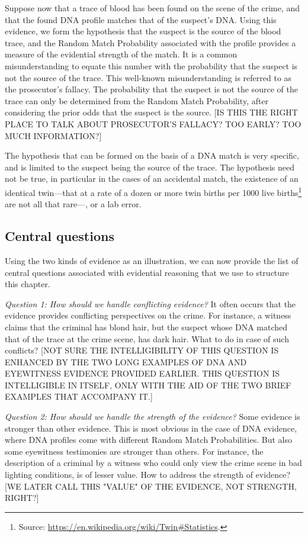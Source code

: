 \documentclass[10pt]{article}
\begin{document}
Suppose now that a trace of blood has been found on the scene of the crime, and that the found DNA profile matches that of the suspect's DNA. Using this evidence, we form the hypothesis that the suspect is the source of the blood trace, and the Random Match Probability associated with the profile provides a measure of the evidential strength of the match. It is a common misunderstanding to equate this number with the probability that the suspect is not the source of the trace. This well-known misunderstanding is referred to as the prosecutor's fallacy. The probability that the suspect is not the source of the trace can only be determined from the Random Match Probability, after considering the prior odds that the suspect is the source. [IS THIS THE RIGHT PLACE TO TALK ABOUT PROSECUTOR'S FALLACY? TOO EARLY? TOO MUCH INFORMATION?]

The hypothesis that can be formed on the basis of a DNA match is very specific, and is limited to the suspect being the source of the trace. The hypothesis need not be true, in particular in the cases of an accidental match, the existence of an identical twin---that at a rate of a dozen or more twin births per 1000 live births\footnote{Source: 
\url{https://en.wikipedia.org/wiki/Twin\#Statistics}.} are not all that rare---, or a lab error. 

\subsection{Central questions}

Using the two kinds of evidence as an illustration, we can now provide the list of central questions associated 
with evidential reasoning that we use to structure this chapter.

\textit{Question 1:	How should we handle conflicting evidence?}
It often occurs that the evidence provides conflicting perspectives on the crime. For instance, a witness claims that the criminal has blond hair, but the suspect whose DNA matched that of the trace at the crime scene, has dark hair. What to do in case of such conflicts? [NOT SURE THE INTELLIGIBILITY OF THIS QUESTION IS ENHANCED BY THE TWO LONG EXAMPLES OF DNA AND EYEWITNESS EVIDENCE PROVIDED EARLIER. THIS QUESTION IS  INTELLIGIBLE IN ITSELF, ONLY WITH THE AID OF THE TWO BRIEF EXAMPLES THAT ACCOMPANY IT.]

\textit{Question 2:	How should we handle the strength of the evidence?}
Some evidence is stronger than other evidence. This is most obvious in the case of DNA evidence, where DNA profiles come with different Random Match Probabilities. But also some eyewitness testimonies are stronger than others. For instance, the description of a criminal by a witness who could only view the crime scene in bad lighting conditions, is of lesser value. How to address the strength of evidence?
[WE LATER CALL THIS "VALUE" OF THE EVIDENCE, NOT STRENGTH, RIGHT?]
\end{document}
